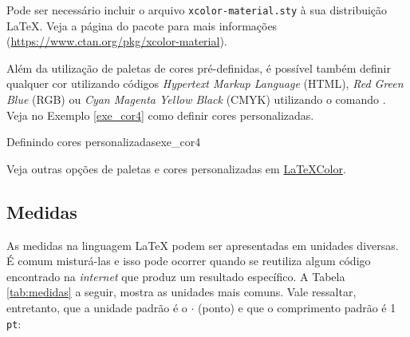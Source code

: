 \begin{marker}
  Pode ser necessário incluir o arquivo {\tt xcolor-material.sty} à sua distribuição \LaTeX{}. Veja a página do pacote para mais informações (\url{https://www.ctan.org/pkg/xcolor-material}).
\end{marker}

Além da utilização de paletas de cores pré-definidas, é possível também definir qualquer cor utilizando códigos \textit{Hypertext Markup Language} (HTML), \textit{Red Green Blue} (RGB) ou \textit{Cyan Magenta Yellow Black} (CMYK) utilizando o comando \texttt{\definecolor}. Veja no Exemplo \ref{exe_cor4} como definir cores personalizadas.

\begin{texexptitled}[breakable,center lower,enhanced,middle=2mm]{Definindo cores personalizadas}{exe_cor4}

\end{texexptitled}

\begin{marker}
Veja outras opções de paletas e cores personalizadas em \href{http://latexcolor.com}{LaTeXColor}.
\end{marker}

\subsection{Medidas}
\label{sec:medidas}

As medidas na linguagem \LaTeX{} podem ser apresentadas em unidades diversas. É comum misturá-las e isso pode ocorrer quando se reutiliza algum código encontrado na \textit{internet} que produz um resultado específico. A Tabela \ref{tab:medidas} a seguir, mostra as unidades mais comuns. Vale ressaltar, entretanto, que a unidade padrão é o $\cdot$ (ponto) e que o comprimento padrão é 1 {\tt pt}:

